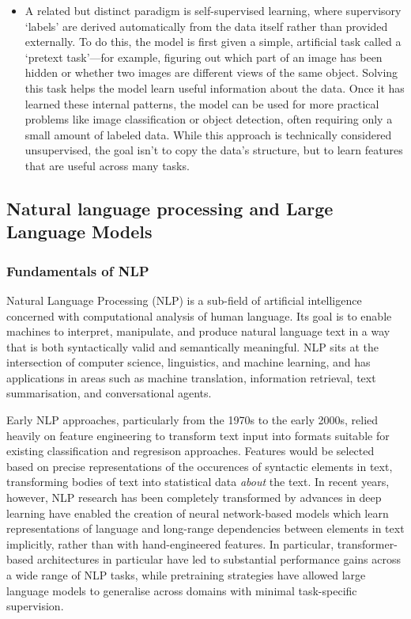 \documentclass{report}
\begin{document}
\begin{itemize}
\item A related but distinct paradigm is self-supervised learning, where supervisory `labels' are derived automatically from the data itself rather than provided externally\cite{Rani2023SSLReview}. To do this, the model is first given a simple, artificial task called a `pretext task'—for example, figuring out which part of an image has been hidden or whether two images are different views of the same object. Solving this task helps the model learn useful information about the data. Once it has learned these internal patterns, the model can be used for more practical problems like image classification or object detection, often requiring only a small amount of labeled data. While this approach is technically considered unsupervised, the goal isn't to copy the data's structure, but to learn features that are useful across many tasks.
\end{itemize}


\subsection{Natural language processing and Large Language Models}

\subsubsection{Fundamentals of NLP}

Natural Language Processing (NLP) is a sub-field of artificial intelligence concerned with computational analysis of human language\cite{jm-2025-nlp}. Its goal is to enable machines to interpret, manipulate, and produce natural language text in a way that is both syntactically valid and semantically meaningful. NLP sits at the intersection of computer science, linguistics, and machine learning, and has applications in areas such as machine translation, information retrieval, text summarisation, and conversational agents.

Early NLP approaches, particularly from the 1970s to the early 2000s, relied heavily on feature engineering to transform text input into formats suitable for existing classification and regresison approaches\cite{manning1999foundations}. Features would be selected based on precise representations of the occurences of syntactic elements in text, transforming bodies of text into statistical data \textit{about} the text. In recent years, however, NLP research has been completely transformed by advances in deep learning have enabled the creation of neural network-based models which learn representations of language and long-range dependencies between elements in text implicitly, rather than with hand-engineered features\cite{jm-2025-nlp}. In particular, transformer-based architectures in particular have led to substantial performance gains across a wide range of NLP tasks, while pretraining strategies have allowed large language models to generalise across domains with minimal task-specific supervision.
\end{document}

